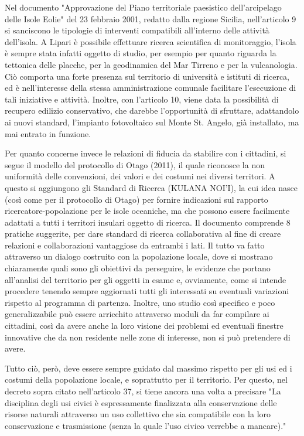 \documentclass[fleqn,11pt]{SelfArx} %
\begin{document}
Nel documento "Approvazione del Piano territoriale paesistico dell'arcipelago delle Isole Eolie" del 23 febbraio 2001, redatto dalla regione Sicilia, nell'articolo 9 si sanciscono le tipologie di interventi compatibili all'interno delle attività dell'isola. A Lipari è possibile effettuare ricerca scientifica di monitoraggio, l'isola è sempre stata infatti oggetto di studio, per esempio per quanto riguarda la tettonica delle placche, per la geodinamica del Mar Tirreno e per la vulcanologia. Ciò comporta una forte presenza sul territorio di università e istituti di ricerca, ed è nell'interesse della stessa amministrazione comunale facilitare l'esecuzione di tali iniziative e attività.
Inoltre, con l'articolo 10,  viene data la possibilità di recupero edilizio conservativo, che darebbe l'opportunità di sfruttare, adattandolo ai nuovi standard, l'impianto fotovoltaico sul Monte St. Angelo, già installato, ma mai entrato in funzione. 

Per quanto concerne invece le relazioni di fiducia da stabilire con i cittadini, si segue il modello del protocollo di Otago (2011), il quale riconosce la non uniformità delle convenzioni, dei valori e dei costumi nei diversi territori. A questo si aggiungono gli Standard di Ricerca (KULANA NOI'I), la cui idea nasce (così come per il protocollo di Otago) per fornire indicazioni sul rapporto ricercatore-popolazione per le isole oceaniche, ma che possono essere facilmente adattati a tutti i territori insulari oggetto di ricerca. Il documento comprende 8 pratiche suggerite, per dare standard di ricerca collaborativa al fine di creare relazioni e collaborazioni vantaggiose da entrambi i lati. Il tutto va fatto attraverso un dialogo costruito con la popolazione locale, dove si mostrano chiaramente quali sono gli obiettivi da perseguire, le evidenze che portano all'analisi del territorio per gli oggetti in esame e, ovviamente, come si intende procedere tenendo sempre aggiornati tutti gli interessati su eventuali variazioni rispetto al programma di partenza. Inoltre, uno studio così specifico e poco generalizzabile può essere arricchito attraverso moduli da far compilare ai cittadini, così da avere anche la loro visione dei problemi ed eventuali finestre innovative che da non residente nelle zone di interesse, non si può pretendere di avere. 

Tutto ciò, però, deve essere sempre guidato dal massimo rispetto per gli usi ed i costumi della popolazione locale, e soprattutto per il territorio. Per questo, nel decreto sopra citato nell'articolo 37, si tiene ancora una volta a precisare "La disciplina degli usi civici è espressamente finalizzata alla conservazione delle risorse naturali attraverso un uso collettivo che sia compatibile con la loro conservazione e trasmissione (senza la quale l'uso civico verrebbe a mancare)."
\end{document}

